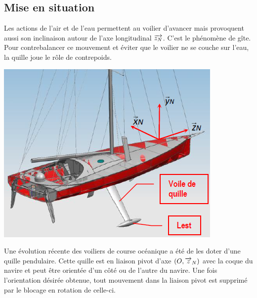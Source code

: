 \documentclass[10pt,fleqn]{article} %
\begin{document}

\vspace{4.5cm}
\pagestyle{fancy}
\thispagestyle{plain}


\def\columnseprulecolor{\color{ocre}}
\setlength{\columnseprule}{0.4pt} 

\ifprof
\else
\begin{multicols}{2}
\fi

\section*{Mise en situation}
\ifprof
\else

Les actions de l'air et de l'eau permettent au voilier d'avancer mais provoquent aussi son inclinaison autour de l'axe longitudinal $\overrightarrow{z_N}$. C’est le phénomène de gîte. Pour contrebalancer ce mouvement et éviter que le voilier ne se couche sur l’eau, la quille joue le rôle de contrepoids. 


\begin{center}
\includegraphics[width=.8\linewidth]{images/fig_01}
\end{center}

Une évolution récente des voiliers de course océanique a été de les doter d’une quille pendulaire. Cette quille est en liaison pivot d’axe $\left(O,\overrightarrow{z}_N \right)$ avec la coque du navire et peut être orientée d’un côté ou de l’autre du navire. Une fois l’orientation désirée obtenue, tout mouvement dans la liaison pivot est supprimé par le blocage en rotation de celle-ci. 



\end{multicols}
\end{document}
